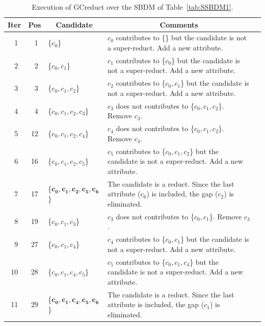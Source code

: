 \documentclass[number,preprint,review,12pt]{elsarticle}
\begin{document}
\begin{table}[!htb]
	\caption{Execution of GCreduct over the SBDM of Table~\ref{tab:SSBDM1}.}\label{tab:sample_GCreduct}
	\centering \scriptsize
	\begin{tabular}{|c|c|l|l|l|}
		\hline
		Iter & Pos & \multicolumn{1}{c|}{Candidate} & \multicolumn{1}{c|}{Comments}\\
		\hline
		~1 & ~1 & \{$c_0$\} 			    & \multicolumn{1}{p{8.5cm}|}{$c_0$ contributes to \{\} but the candidate is not a super-reduct. Add a new attribute.}\\
				\hline
		~2 & ~2 & \{$c_0,c_1$\}				& \multicolumn{1}{p{8.5cm}|}{$c_1$ contributes to \{$c_0$\} but the candidate is not a super-reduct. Add a new attribute.}\\
				\hline
		~3 & ~3 & \{$c_0,c_1,c_2$\}			& \multicolumn{1}{p{8.5cm}|}{$c_2$ contributes to \{$c_0,c_1$\} but the candidate is not a super-reduct. Add a new attribute.}\\
				\hline				
		~4 & ~4 & \{$c_0,c_1,c_2,c_3$\}		& \multicolumn{1}{p{8.5cm}|}{$c_3$ does not contributes to \{$c_0,c_1,c_2$\}. Remove $c_3$.}\\
				\hline
		~5 & 12 & \{$c_0,c_1,c_2,c_4$\}		& \multicolumn{1}{p{8.5cm}|}{$c_4$ does not contributes to \{$c_0,c_1,c_2$\}. Remove $c_4$.}\\
				\hline
		~6 & 16 & \{$c_0,c_1,c_2,c_5$\}		& \multicolumn{1}{p{8.5cm}|}{$c_5$ contributes to \{$c_0,c_1,c_2$\} but the candidate is not a super-reduct. Add a new attribute.}\\
				\hline
		~7 & 17 & \{$\mathbf{c_0,c_1,c_2,c_5,c_6}$\} & \multicolumn{1}{p{8.5cm}|}{The candidate is a reduct. Since the last attribute ($c_6$) is included, the gap ($c_2$) is eliminated.}\\
				\hline
		~8 & 19 & \{$c_0,c_1,c_3$\}			& \multicolumn{1}{p{8.5cm}|}{$c_3$ does not contributes to \{$c_0,c_1$\}. Remove $c_3$.}\\
				\hline
		~9 & 27 & \{$c_0,c_1,c_4$\}			& \multicolumn{1}{p{8.5cm}|}{$c_4$ contributes to \{$c_0,c_1$\} but the candidate is not a super-reduct. Add a new attribute.}\\
				\hline
		10 & 28 & \{$c_0,c_1,c_4,c_5$\}		& \multicolumn{1}{p{8.5cm}|}{$c_5$ contributes to \{$c_0,c_1,c_4$\} but the candidate is not a super-reduct. Add a new attribute.}\\
				\hline
		11 & 29 & \{$\mathbf{c_0,c_1,c_4,c_5,c_6}$\} & \multicolumn{1}{p{8.5cm}|}{The candidate is a reduct. Since the last attribute is included, the gap ($c_1$) is eliminated.}\\

\end{tabular}
\end{table}
\end{document}
